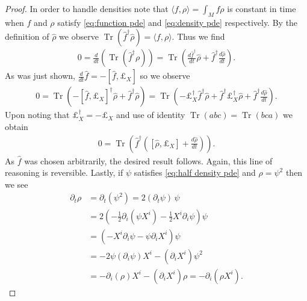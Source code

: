 \documentclass[final,leqno]{siamltex1213}
\DeclareMathOperator{\Tr}{Tr}
\begin{document}
\begin{proof}
	In order to handle densities note that $\langle f , \rho \rangle = \int_{M} f\rho$ is constant in time when $f$
	and $\rho$ satisfy \eqref{eq:function pde} and \eqref{eq:density pde} respectively.
	By the definition of $\hat{\rho}$ we observe $\Tr( \hat{f}^{\dagger} \hat{\rho}) = \langle f , \rho \rangle$.
	Thus we find
	\begin{align}
		0 = \frac{d}{dt} \left( \Tr( \hat{f}^{\dagger} \rho ) \right) = \Tr \left( \frac{d \hat{f}^{\dagger}}{dt} \hat{\rho} + \hat{f}^{\dagger} \frac{d \hat{\rho}}{dt} \right).
	\end{align}
	As was just shown, $\frac{d}{dt} \hat{f} =  - [\hat{f} , \pounds_{X} ]$ so we observe
	\begin{align}
		0 = \Tr( - [\hat{f} , \pounds_{X} ]^{\dagger} \hat{\rho} + \hat{f}^{\dagger} \hat{\rho} ) = \Tr( - \pounds_{X}^{\dagger} \hat{f}^{\dagger} \hat{\rho} + \hat{f}^{\dagger} \pounds_{X}^{\dagger} \hat{\rho} + \hat{f}^{\dagger} \frac{d\hat{\rho}}{dt} ).
	\end{align}
	Upon noting that $\pounds_{X}^{\dagger} = - \pounds_{X}$ and use of identity $\Tr( a b c) = \Tr( bc a)$ we obtain
	\begin{align}
		0 = \Tr \left( \hat{f}^{\dagger}( [\hat{\rho} , \pounds_{X} ] + \frac{d \hat{\rho}}{dt} ) \right).
	\end{align}
	As $\hat{f}$ was chosen arbitrarily, the desired result follows.
	Again, this line of reasoning is reversible.
%	
%	
	Lastly, if $\psi$ satisfies \eqref{eq:half density pde} and $\rho = \psi^{2}$ then we see
	\begin{align}
		\partial_{t} \rho &= \partial_{t} ( \psi^{2}) = 2 (\partial_{t} \psi ) \, \psi \\
		&= 2 \left( - \frac{1}{2} \partial_{i} (\psi X^{i}) - \frac{1}{2} X^{i} \partial_{i} \psi \right) \psi \\
		&= \left( - X^{i} \partial_{i} \psi - \psi \partial_{i} X^{i}  \right) \psi \\
		&= - 2 \psi (\partial_{i} \psi) X^{i} - (\partial_{i}X^{i}) \psi^{2}\\
		&= - \partial_{i}(\rho) X^{i} - (\partial_{i}X^{i}) \rho = - \partial_{i} ( \rho X^{i}).
	\end{align}
\end{proof}
\end{document}
